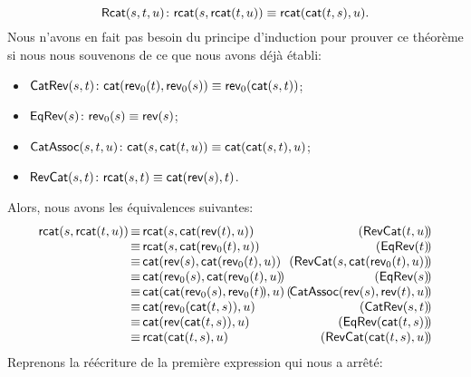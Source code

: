 \begin{equation*}
  \textsf{Rcat}({s,t,u}) \colon \textsf{rcat}(s,\textsf{rcat}(t,u)) \equiv \textsf{rcat}(\textsf{cat}(t,s),u).
\end{equation*}
Nous n'avons en fait pas besoin du principe d'induction pour prouver
ce théorème si nous nous souvenons de ce que nous avons déjà établi:
\begin{itemize}

  \item \(\textsf{CatRev}({s,t}) \colon \textsf{cat}(\textsf{rev}_0(t),
    \textsf{rev}_0(s)) \equiv \textsf{rev}_0(\textsf{cat}(s,t))\);

  \item \(\textsf{EqRev}({s}) \colon \textsf{rev}_0(s) \equiv \textsf{rev}(s)\);

  \item \(\textsf{CatAssoc}({s,t,u}) \colon \textsf{cat}(s,\textsf{cat}(t,u))
    \equiv \textsf{cat}(\textsf{cat}(s,t),u)\);

  \item \(\textsf{RevCat}({s,t}) \colon \textsf{rcat}(s,t) \equiv
    \textsf{cat}(\textsf{rev}(s),t)\).

\end{itemize}
Alors, nous avons les équivalences suivantes:
\begin{equation*}
\begin{array}{@{}r@{\,}c@{\,}l@{\,}r@{}}
\fun{rcat}(s,\fun{rcat}(t,u))
& \equiv & \fun{rcat}(s,\fun{cat}(\fun{rev}(t),u))
& (\pred{RevCat}{t,u}\!)\\
& \equiv & \fun{rcat}(s,\fun{cat}(\fun{rev}_0(t),u))
& (\pred{EqRev}{t}\!)\\
& \equiv & \fun{cat}(\fun{rev}(s),\fun{cat}(\fun{rev}_0(t),u))
& (\pred{RevCat}{s,\fun{cat}(\fun{rev}_0(t),u)}\!)\\
& \equiv & \fun{cat}(\fun{rev}_0(s),\fun{cat}(\fun{rev}_0(t),u)\!)
& (\pred{EqRev}{s}\!)\\
& \equiv & \fun{cat}(\fun{cat}(\fun{rev}_0(s),\fun{rev}_0(t)\!),u)\!\!
& (\!\pred{CatAssoc}{\fun{rev}(s),\fun{rev}(t),u}\!)\\
& \equiv & \fun{cat}(\fun{rev}_0(\fun{cat}(t,s)),u)
& (\pred{CatRev}{s,t}\!)\\
& \equiv & \fun{cat}(\fun{rev}(\fun{cat}(t,s)),u)
& (\pred{EqRev}{\fun{cat}(t,s)}\!)\\
& \equiv & \fun{rcat}(\fun{cat}(t,s),u)
& (\pred{RevCat}{\fun{cat}(t,s),u}\!)
\end{array}
\end{equation*}
Reprenons la réécriture de la première expression qui nous a arrêté:

